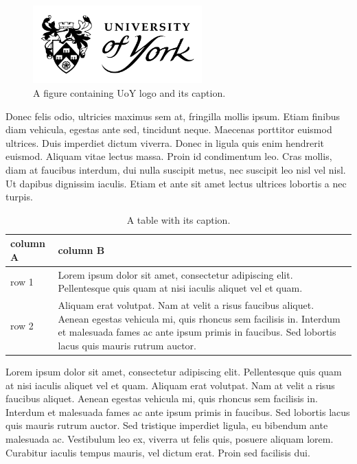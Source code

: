 \documentclass{UoYCSproject}
\begin{document}
\begin{figure}[htb]
\begin{center}
\includegraphics[height=3cm]{"./UoY"}
\end{center}
\caption{A figure containing UoY logo and its caption.}
\end{figure}

Donec felis odio, ultricies maximus sem at, fringilla mollis ipsum. Etiam finibus diam vehicula, egestas ante sed, tincidunt neque. Maecenas porttitor euismod ultrices. Duis imperdiet dictum viverra. Donec in ligula quis enim hendrerit euismod. Aliquam vitae lectus massa. Proin id condimentum leo. Cras mollis, diam at faucibus interdum, dui nulla suscipit metus, nec suscipit leo nisl vel nisl. Ut dapibus dignissim iaculis. Etiam et ante sit amet lectus ultrices lobortis a nec turpis.

\begin{table}[htb]
\caption{ A table with its caption.}
\begin{center}
\begin{tabular}{|p{}|p{}|}
\hline
column A & column B \\\hline
row 1 &
Lorem ipsum dolor sit amet, consectetur adipiscing elit. Pellentesque quis quam at nisi iaculis aliquet vel et quam. \\\hline
row 2 &
Aliquam erat volutpat. Nam at velit a risus faucibus aliquet. Aenean egestas vehicula mi, quis rhoncus sem facilisis in. Interdum et malesuada fames ac ante ipsum primis in faucibus. Sed lobortis lacus quis mauris rutrum auctor. \\\hline
\end{tabular}
\end{center}
\end{table}

Lorem ipsum dolor sit amet, consectetur adipiscing elit. Pellentesque quis quam at nisi iaculis aliquet vel et quam. Aliquam erat volutpat. Nam at velit a risus faucibus aliquet. Aenean egestas vehicula mi, quis rhoncus sem facilisis in. Interdum et malesuada fames ac ante ipsum primis in faucibus. Sed lobortis lacus quis mauris rutrum auctor. Sed tristique imperdiet ligula, eu bibendum ante malesuada ac. Vestibulum leo ex, viverra ut felis quis, posuere aliquam lorem. Curabitur iaculis tempus mauris, vel dictum erat. Proin sed facilisis dui.
\end{document}
